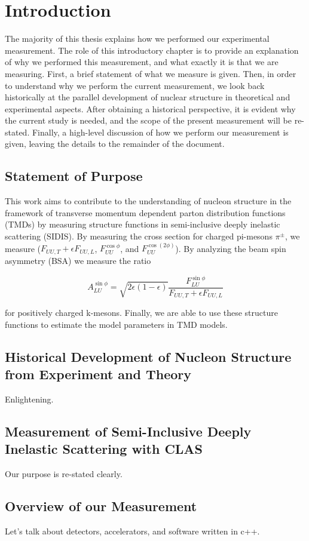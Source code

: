 \chapter{Introduction}
The majority of this thesis explains how we performed our experimental measurement.  The role of this introductory chapter is to provide an explanation of why we performed this measurement, and what exactly it is that we are measuring.  First, a brief statement of what we measure is given.  Then, in order to understand why we perform the current measurement, we look back historically at the parallel development of nuclear structure in theoretical and experimental aspects.  After obtaining a historical perspective, it is evident why the current study is needed, and the scope of the present measurement will be re-stated.  Finally, a high-level discussion of how we perform our measurement is given, leaving the details to the remainder of the document.

\section{Statement of Purpose}
This work aims to contribute to the understanding of nucleon structure in the framework of transverse momentum dependent parton distribution functions (TMDs) by measuring structure functions in semi-inclusive deeply inelastic scattering (SIDIS).  By measuring the cross section for charged pi-mesons $\pi^{\pm}$, we measure ($F_{UU,T} + \epsilon F_{UU,L}$, $F_{UU}^{\cos\phi}$, and $F_{UU}^{\cos(2\phi)}$).  By analyzing the beam spin asymmetry (BSA) we measure the ratio

\begin{equation}
  A_{LU}^{\sin\phi} = \sqrt{2\epsilon(1-\epsilon)} \frac{F_{LU}^{\sin\phi}}{F_{UU,T}+\epsilon F_{UU,L}}
\end{equation}

for positively charged k-mesons.  Finally, we are able to use these structure functions to estimate the model parameters in TMD models.

\section{Historical Development of Nucleon Structure from Experiment and Theory}
Enlightening.

\section{Measurement of Semi-Inclusive Deeply Inelastic Scattering with CLAS}
Our purpose is re-stated clearly.

\section{Overview of our Measurement}
Let's talk about detectors, accelerators, and software written in c++. 

